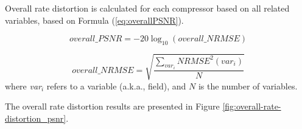 
Overall rate distortion is calculated for each compressor based on all related variables, based on Formula (\ref{eq:overallPSNR}).

\def\formulaOverallPSNR{
	overall\_PSNR = -20 \log_{10}(overall\_NRMSE)
}
\begin{equation}
\label{eq:overallPSNR}
  \formulaOverallPSNR
\end{equation}

\def\formulaOverallNRMSE{
	overall\_NRMSE = \sqrt{\frac{\sum_{var_i} NRMSE^2(var_i)}{N}}
}
\begin{equation}
\label{eq:overallNRMSE}
  \formulaOverallNRMSE
\end{equation}
where \emph{var}$_i$ refers to a variable (a.k.a., field), and $N$ is the number of variables.

The overall rate distortion results are presented in Figure \ref{fig:overall-rate-distortion_psnr}.

